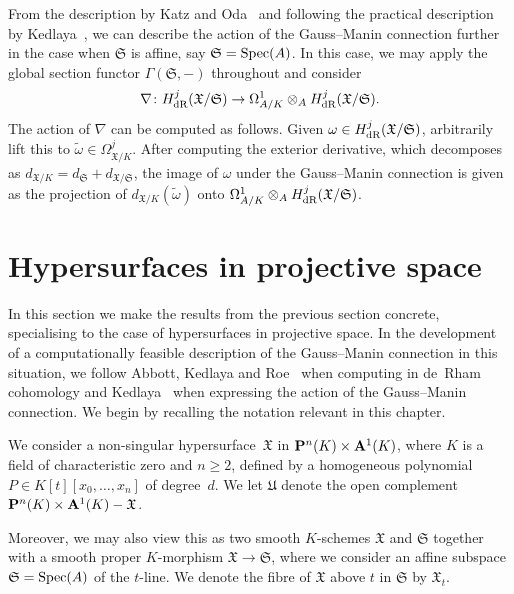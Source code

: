 \begin{rem}
From the description by Katz and Oda~\citep{KatzOda1968} and following the 
practical description by Kedlaya~\citep{Kedlaya2008}, we can describe the 
action of the Gauss--Manin connection further in the case when $\mathfrak{S}$ 
is affine, say $\mathfrak{S} = \operatorname{Spec}(A)$.  In this case, we may apply the 
global section functor $\Gamma(\mathfrak{S}, -)$ throughout and consider
\begin{equation*}
\nabla \colon H_{\text{dR}}^j(\mathfrak{X}/\mathfrak{S}) \rightarrow 
    \Omega_{A/K}^1 \otimes_{A} H_{\text{dR}}^j(\mathfrak{X}/\mathfrak{S}).
\end{equation*}
The action of $\nabla$ can be computed as follows.  Given 
$\omega \in H_{\text{dR}}^j(\mathfrak{X}/\mathfrak{S})$, arbitrarily lift this to 
$\tilde{\omega} \in \Omega_{\mathfrak{X}/K}^j$.  After computing the 
exterior derivative, which decomposes as 
$d_{\mathfrak{X}/K} = d_{\mathfrak{S}} + d_{\mathfrak{X}/\mathfrak{S}}$, 
the image of $\omega$ under the Gauss--Manin connection is given as 
the projection of $d_{\mathfrak{X}/K}(\tilde{\omega})$ onto 
$\Omega_{A/K}^1 \otimes_{A} H_{\text{dR}}^j(\mathfrak{X}/\mathfrak{S})$.
\end{rem}


\section{Hypersurfaces in projective space}
\label{sec:01-04-hypersurfaces}

In this section we make the results from the previous section concrete, 
specialising to the case of hypersurfaces in projective space.  In the 
development of a computationally feasible description of the Gauss--Manin 
connection in this situation, we follow Abbott, Kedlaya and 
Roe~\citep[\S 3.2]{AbbottKedlayaRoe2006} when computing in 
de~Rham cohomology and Kedlaya~\citep[\S 3.2]{Kedlaya2008} when 
expressing the action of the Gauss--Manin connection.  We begin by recalling 
the notation relevant in this chapter.

\begin{notation} \label{not:01-04-main}
We consider a non-singular hypersurface~$\mathfrak{X}$ in 
$\mathbf{P}^n(K) \times \mathbf{A}^1(K)$, where $K$ is a field of characteristic 
zero and $n \geq 2$, defined by a homogeneous polynomial 
$P \in K[t][x_0, \dotsc, x_n]$ of degree~$d$.  We let $\mathfrak{U}$ denote 
the open complement $\mathbf{P}^n(K) \times \mathbf{A}^1(K) - \mathfrak{X}$.

Moreover, we may also view this as two smooth $K$-schemes 
$\mathfrak{X}$ and $\mathfrak{S}$ together with a smooth proper 
$K$-morphism $\mathfrak{X} \to \mathfrak{S}$, where we consider 
an affine subspace $\mathfrak{S} = \operatorname{Spec}(A)$ of the $t$-line\footnotemark.  
We denote the fibre of $\mathfrak{X}$ above $t$ in $\mathfrak{S}$ 
by $\mathfrak{X}_t$.
\end{notation}

